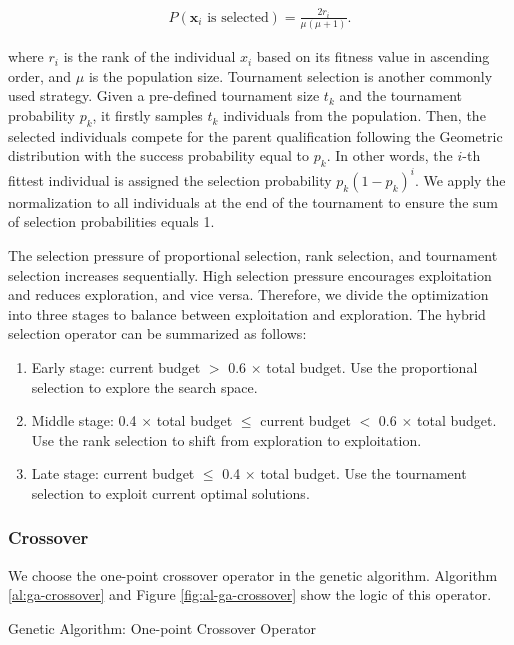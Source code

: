\documentclass{article}
\begin{document}
\begin{align*}
    P\left( \mathbf{x}_i\text{ is selected} \right) = \frac{2r_i}{\mu(\mu + 1)}.
\end{align*}

where $r_i$ is the rank of the individual $x_i$ based on its fitness value in ascending order, and $\mu$ is the population size. Tournament selection is another commonly used strategy. Given a pre-defined tournament size $t_k$ and the tournament probability $p_k$, it firstly samples $t_k$ individuals from the population. Then, the selected individuals compete for the parent qualification following the Geometric distribution with the success probability equal to $p_k$. In other words, the $i$-th fittest individual is assigned the selection probability $p_k\left( 1 - p_k \right)^i $. We apply the normalization to all individuals at the end of the tournament to ensure the sum of selection probabilities equals 1.

The selection pressure of proportional selection, rank selection, and tournament selection increases sequentially. High selection pressure encourages exploitation and reduces exploration, and vice versa. Therefore, we divide the optimization into three stages to balance between exploitation and exploration. The hybrid selection operator can be summarized as follows:

\begin{enumerate}
    \item Early stage: current budget $>$ 0.6 $\times$ total budget. Use the proportional selection to explore the search space.
    \item Middle stage: 0.4 $\times$ total budget $\leq$ current budget $<$ 0.6 $\times$ total budget. Use the rank selection to shift from exploration to exploitation.
    \item Late stage: current budget $\leq$ 0.4 $\times$ total budget. Use the tournament selection to exploit current optimal solutions.
\end{enumerate}

\subsubsection{Crossover}
We choose the one-point crossover operator in the genetic algorithm. Algorithm \ref{al:ga-crossover} and Figure \ref{fig:al-ga-crossover} show the logic of this operator.

\begin{algorithm}[!ht]
\SetAlgoLined
{}
\BlankLine
{}
\caption{Genetic Algorithm: One-point Crossover Operator}\label{al:ga-crossover}
\end{algorithm}
\end{document}
